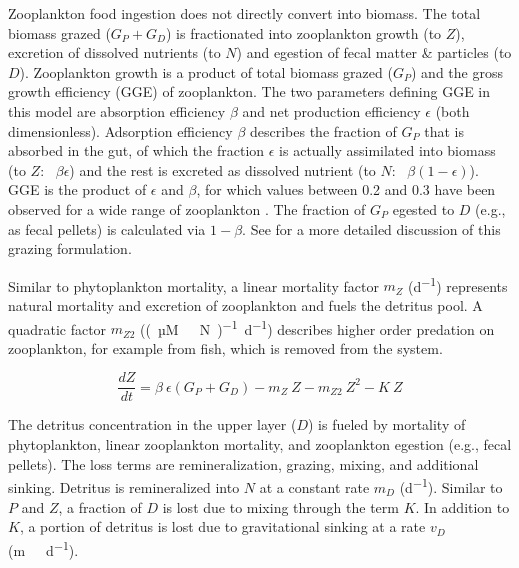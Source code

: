 \documentclass[gmd, manuscript]{copernicus}
\begin{document}
Zooplankton food ingestion does not directly convert into biomass. The total biomass grazed ($G_P + G_D$) is fractionated into zooplankton growth (to $Z$), excretion of dissolved nutrients (to $N$) and egestion of fecal matter \& particles (to $D$). Zooplankton growth is a product of total biomass grazed ($G_P$) and the gross growth efficiency (GGE) of zooplankton. The two parameters defining GGE in this model are absorption efficiency $\beta$ and net production efficiency $\epsilon$ (both dimensionless). Adsorption efficiency $\beta$ describes the fraction of $G_P$ that is absorbed in the gut, of which the fraction $\epsilon$ is actually assimilated into biomass (to $Z$: \ $\beta \epsilon$) and the rest is excreted as dissolved nutrient (to $N$: \ $\beta (1-\epsilon)$). GGE is the product of $\epsilon$ and $\beta$, for which values between 0.2 and 0.3 have been observed for a wide range of zooplankton \citep{Straile1997GrossGroup}. The fraction of $G_P$ egested to $D$ (e.g., as fecal pellets) is calculated via $1-\beta$. See \citet{Anderson2015c} for a more detailed discussion of this grazing formulation.

Similar to phytoplankton mortality, a linear mortality factor $m_Z$ (\unit{d^{-1}}) represents natural mortality and excretion of zooplankton and fuels the detritus pool. A quadratic factor $m_{Z2}$ (\unit{(µM \ N)^{-1} d^{−1}}) describes higher order predation on zooplankton, for example from fish, which is removed from the system. 

\begin{equation}
    \label{Eq:EmpowerZoo}
    \frac{d Z}{d t} =
    \beta \ \epsilon(G_P + G_D) %
    - m_Z \ Z %
    - m_{Z2} \ Z^2 %
    - K \ Z %
\end{equation}


The detritus concentration in the upper layer ($D$) is fueled by mortality of phytoplankton, linear zooplankton mortality, and zooplankton egestion (e.g., fecal pellets). The loss terms are remineralization, grazing, mixing, and additional sinking. Detritus is remineralized into $N$ at a constant rate $m_D$ (\unit{d^{−1}}). Similar to $P$ and $Z$, a fraction of $D$ is lost due to mixing through the term $K$. In addition to $K$, a portion of detritus is lost due to gravitational sinking at a rate $v_D$ (\unit{m\ d^{−1}}). 
\end{document}

